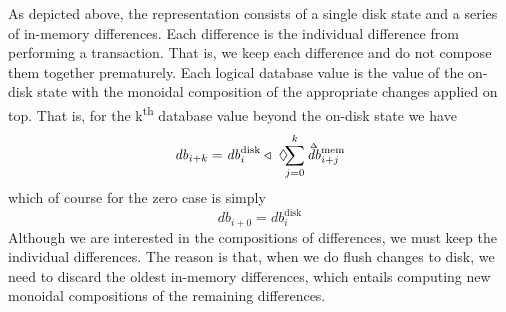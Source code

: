 \documentclass[11pt,a4paper]{article}
\newcommand\deltavar[1]{\accentset{\Delta}{#1}}
\begin{document}
\begin{center}
\end{center}
As depicted above, the representation consists of a single disk
state and a series of in-memory differences. Each difference is the individual
difference from performing a transaction. That is, we keep each difference and
do not compose them together prematurely. Each logical database value is
the value of the on-disk state with the monoidal composition of the appropriate
changes applied on top. That is, for the k\textsuperscript{th} database value
beyond the on-disk state we have
\[
\mathit{db}_{i+k}
= \mathit{db}^{\mathrm{disk}}_i \triangleleft ~
            \displaystyle\Diamond\hspace{-4pt}\sum_{j=0}^k{\deltavar{\mathit{db}}^{\mathrm{mem}}_{i+j}}
\]
which of course for the zero case is simply
\[
\mathit{db}_{i+0}
= \mathit{db}^{\mathrm{disk}}_i
\]
Although we are interested in the compositions of differences, we must keep the
individual differences. The reason is that, when we do flush changes to disk, we
need to discard the oldest in-memory differences, which entails computing new
monoidal compositions of the remaining differences.
\end{document}
